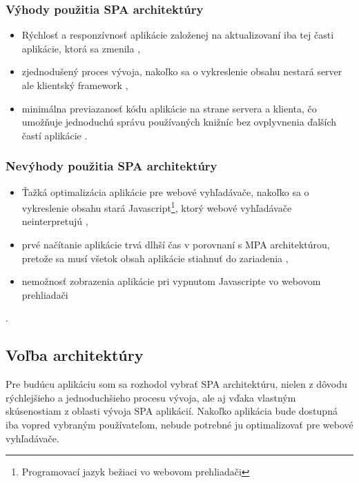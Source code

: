 \subsubsection*{Výhody použitia SPA architektúry}

\begin{itemize}
	\item Rýchlosť a responzívnosť aplikácie založenej na aktualizovaní iba tej časti aplikácie, ktorá sa zmenila \cite{spa-vs-mpa-1},
	\item zjednodušený proces vývoja, nakoľko sa o vykreslenie obsahu nestará server ale klientský framework \cite{spa-vs-mpa-3},
	\item minimálna previazanosť kódu aplikácie na strane servera a klienta, čo umožňuje jednoduchú správu používaných knižníc bez ovplyvnenia ďalších častí aplikácie \cite{spa-vs-mpa-2}.
\end{itemize}


\subsubsection*{Nevýhody použitia SPA architektúry}

\begin{itemize}
	\item Ťažká optimalizácia aplikácie pre webové vyhľadávače, nakoľko sa o vykreslenie obsahu stará Javascript\footnote{Programovací jazyk bežiaci vo webovom prehliadači}, ktorý webové vyhľadávače neinterpretujú \cite{spa-vs-mpa-1},
	\item prvé načítanie aplikácie trvá dlhší čas v porovnaní s MPA architektúrou, pretože sa musí všetok obsah aplikácie stiahnuť do zariadenia \cite{spa-vs-mpa-1},
	\item nemožnosť zobrazenia aplikácie pri vypnutom Javascripte vo webovom prehliadači \cite{spa-vs-mpa-2}
\end{itemize}.


\subsection{Voľba architektúry}

Pre budúcu aplikáciu som sa rozhodol vybrať SPA architektúru, nielen z dôvodu rýchlejšieho a jednoduchšieho procesu vývoja, ale aj vďaka vlastným skúsenostiam z oblasti vývoja SPA aplikácií. Nakoľko aplikácia bude dostupná iba vopred vybraným používateľom, nebude potrebné ju optimalizovať pre webové vyhľadávače.

\pagebreak


